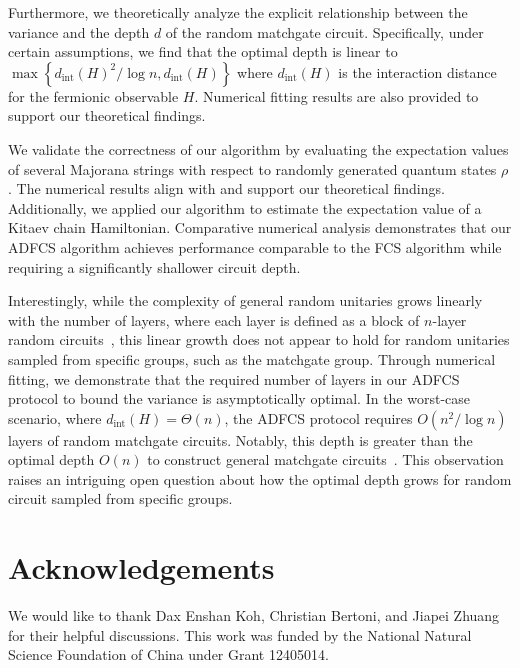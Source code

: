 \documentclass[showpacs,twocolumn,aps,prx,long bibliography,superscriptaddress,notitlepage]{revtex4-1}
\begin{document}
Furthermore, we theoretically analyze the explicit relationship between the variance and the depth $d$ of the random matchgate circuit. Specifically, under certain assumptions, we find that the optimal depth is linear to $\max\left\{{d_{\text{int}}(H)^2}/{\log n}, d_{\text{int}}(H)\right\}$ where $d_{\text{int}}(H)$ is the interaction distance for the fermionic observable $H$. Numerical fitting results are also provided to support our theoretical findings.

We validate the correctness of our algorithm by evaluating the expectation values of several Majorana strings with respect to randomly generated quantum states $\rho$. The numerical results align with and support our theoretical findings. Additionally, we applied our algorithm to estimate the expectation value of a Kitaev chain Hamiltonian. Comparative numerical analysis demonstrates that our ADFCS algorithm achieves performance comparable to the FCS algorithm while requiring a significantly shallower circuit depth.

{Interestingly, while the complexity of general random unitaries grows linearly with the number of layers, where each layer is defined as a block of $n$-layer random circuits~\cite{haferkamp2022linear}, this linear growth does not appear to hold for random unitaries sampled from specific groups, such as the matchgate group.
Through numerical fitting, we demonstrate that the required number of layers in our ADFCS protocol to bound the variance is asymptotically optimal. In the worst-case scenario, where $d_{\text{int}}(H) = \Theta(n)$, the ADFCS protocol requires $O(n^2 / \log n)$ layers of random matchgate circuits. Notably, this depth is greater than the optimal depth $O(n)$ to construct general matchgate circuits~\cite{jiang2018quantum}.
 This observation raises an intriguing open question about how the optimal depth grows for random circuit sampled from specific groups.}


\section*{Acknowledgements}
 We would like to thank Dax Enshan Koh, Christian Bertoni, {and Jiapei Zhuang} for their helpful discussions.
This work was funded by the National Natural Science Foundation of China under Grant 12405014.



% 
\end{document}
